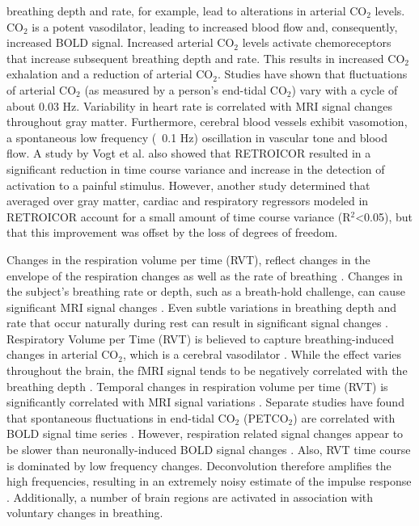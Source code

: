 \documentclass[twoside,twocolumn]{article}
\begin{document}
breathing depth and rate, for example, lead to alterations in arterial CO$_2$ levels.  CO$_2$ is a potent vasodilator, leading to increased blood flow and, consequently, increased BOLD signal\cite{Birn2006}.  Increased arterial CO$_2$ levels activate chemoreceptors that increase subsequent breathing depth and rate. This results in increased CO$_2$ exhalation and a reduction of arterial CO$_2$. Studies have shown that ﬂuctuations of arterial CO$_2$ (as measured by a person's end-tidal CO$_2$) vary with a cycle of about 0.03 Hz\cite{Modarreszadeh1994}.  Variability in heart rate is correlated with MRI signal changes throughout gray matter\cite{Chang2009}.  Furthermore, cerebral blood vessels exhibit vasomotion, a spontaneous low frequency (~0.1 Hz) oscillation in vascular tone and blood ﬂow\cite{Hudetz1998}.  A study by Vogt et al. also showed that RETROICOR resulted in a signiﬁcant reduction in time course variance and increase in the detection of activation to a painful stimulus\cite{Vogt2011}.  However, another study\cite{Jo2010} determined that averaged over gray matter, cardiac and respiratory regressors modeled in RETROICOR account for a small amount of time course variance (R$^2$<0.05), but that this improvement was offset by the loss of degrees of freedom. 

Changes in the respiration volume per time (RVT), reflect changes in the envelope of the respiration changes as well as the rate of breathing \cite{Birn2006}. Changes in the subject’s breathing rate or depth, such as a breath-hold challenge, can cause significant MRI signal changes \cite{Birn1993}.  Even subtle variations in breathing depth and rate that occur naturally during rest can result in significant signal changes \cite{Wise2004}\cite{Birn2006}.  Respiratory Volume per Time (RVT) is believed to capture breathing-induced changes in arterial CO$_2$, which is a cerebral vasodilator \cite{Chang2009}.  While the effect varies throughout the brain, the fMRI signal tends to be negatively correlated with the breathing depth \cite{Birn2012}. Temporal changes in respiration volume per time (RVT) is significantly correlated with MRI signal variations \cite{Birn2006}.  Separate studies have found that spontaneous fluctuations in end-tidal CO$_2$ (PETCO$_2$) are correlated with BOLD signal time series \cite{Chang2009}. However, respiration related signal changes appear to be slower than neuronally-induced BOLD signal changes \cite{Birn1993}. Also, RVT time course is dominated by low frequency changes. Deconvolution therefore amplifies the high frequencies, resulting in an extremely noisy estimate of the impulse response \cite{Birn2006}. Additionally, a number of brain regions are activated in association with voluntary changes in breathing\cite{McKay2003}.
\end{document}
